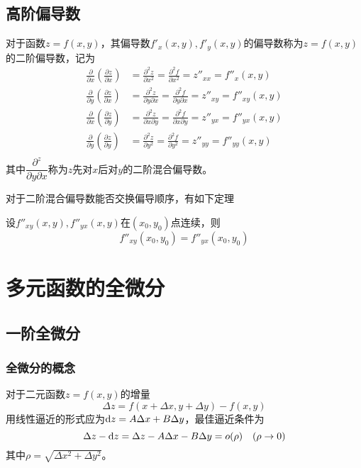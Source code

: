 \subsection{高阶偏导数}
对于函数$z=f(x,y)$，其偏导数$f'_x(x,y), f'_y(x,y)$的偏导数称为$z=f(x,y)$的二阶偏导数，记为
\begin{align*}
    \frac{\partial}{\partial x}\left(\frac{\partial z}{\partial x}\right) & = \frac{\partial^2 z}{\partial x^2} = \frac{\partial^2 f}{\partial x^2} = z''_{xx}=f''_x(x,y)                     \\
    \frac{\partial}{\partial y}\left(\frac{\partial z}{\partial x}\right) & = \frac{\partial^2 z}{\partial y \partial x} = \frac{\partial^2 f}{\partial y\partial x} = z''_{xy}=f''_{xy}(x,y) \\
    \frac{\partial}{\partial x}\left(\frac{\partial z}{\partial y}\right) & = \frac{\partial^2 z}{\partial x\partial y} = \frac{\partial^2 f}{\partial x\partial y} = z''_{yx}=f''_{yx}(x,y)  \\
    \frac{\partial}{\partial y}\left(\frac{\partial z}{\partial y}\right) & = \frac{\partial^2 z}{\partial y^2} = \frac{\partial^2 f}{\partial y^2} = z''_{yy}=f''_{yy}(x,y)                  \\
\end{align*}
其中$\dfrac{\partial^z}{\partial y\partial x}$称为$z$先对$x$后对$y$的二阶混合偏导数。

对于二阶混合偏导数能否交换偏导顺序，有如下定理
\begin{theorem}
    设$f''_{xy}(x,y),f''_{yx}(x,y)$在$(x_0,y_0)$点连续，则
    \[ f''_{xy}(x_0,y_0) = f''_{yx}(x_0,y_0) \]
\end{theorem}

\section{多元函数的全微分}
\subsection{一阶全微分}
\subsubsection{全微分的概念}
对于二元函数$z=f(x,y)$的增量
\[ \Delta z = f(x+\Delta x,y+\Delta y) - f(x,y) \]
用线性逼近的形式应为$\mathop{}\!\mathrm{d} z = A \Delta x + B \Delta y$，最佳逼近条件为
\[ \Delta z- \mathop{}\!\mathrm{d} z = \Delta z - A\Delta x - B \Delta y = o(\rho) \quad (\rho \to 0) \]
其中$\rho = \sqrt{\Delta x^2 + \Delta y^2}$。

